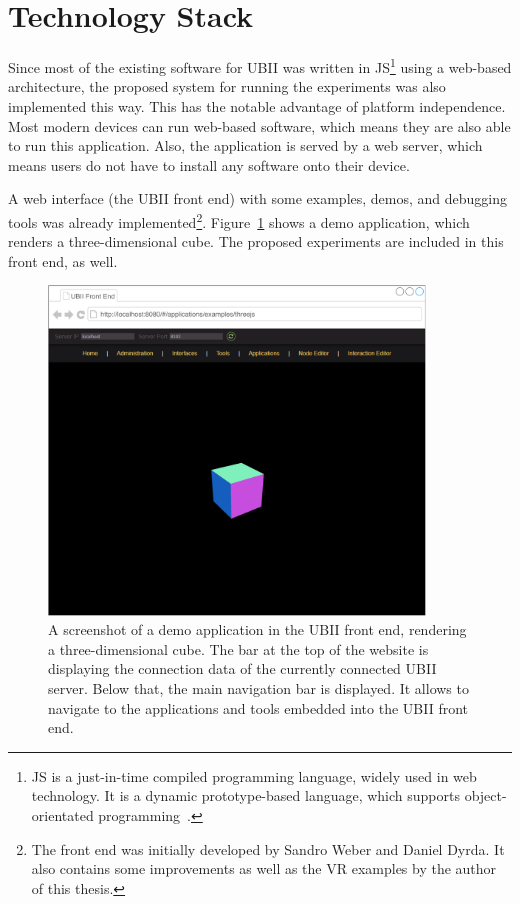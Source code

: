 \section{Technology Stack}\label{section:technology-stack}

Since most of the existing software for \gls{UBII} was written in \gls{JS}\footnote{\gls{JS} is a just-in-time compiled programming language, widely used in web technology. It is a dynamic prototype-based language, which supports object-orientated programming~\cite[43, 47]{ECMAInternational.2018}.} using a web-based architecture, the proposed system for running the experiments was also implemented this way. This has the notable advantage of platform independence. Most modern devices can run web-based software, which means they are also able to run this application. Also, the application is served by a web server, which means users do not have to install any software onto their device.

A web interface (the \gls{UBII} front end) with some examples, demos, and debugging tools was already implemented\footnote{The front end was initially developed by Sandro Weber and Daniel Dyrda. It also contains some improvements as well as the \gls{VR} examples by the author of this thesis.}. Figure~\ref{fig:ubii-front-end} shows a demo application, which renders a three-dimensional cube. The proposed experiments are included in this front end, as well.

\begin{figure}[H]
	\centering
	\includegraphics[width=10cm]{figures/implementation/ubii_front_end.pdf}
	\caption[Screenshot of the front end]{A screenshot of a demo application in the UBII front end, rendering a three-dimensional cube. The bar at the top of the website is displaying the connection data of the currently connected \gls{UBII} server. Below that, the main navigation bar is displayed. It allows to navigate to the applications and tools embedded into the \gls{UBII} front end.}\label{fig:ubii-front-end}
\end{figure}

